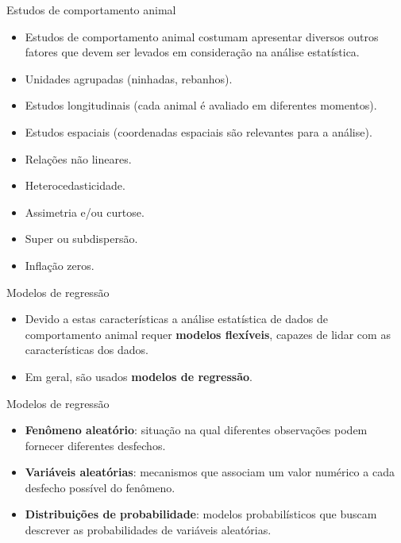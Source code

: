 \documentclass[
  ignorenonframetext,
  serif,
  professionalfont,
  usenames,
  dvipsnames,
  aspectratio = 169]{beamer}
\providecommand{\tightlist}{%
  \setlength{\itemsep}{0pt}\setlength{\parskip}{0pt}}
\renewcommand{\tightlist}{%
  \setlength{\itemsep}{0\baselineskip}
  \setlength{\parskip}{0.25\baselineskip}
}
\def\beginAHalfColumn{\begin{minipage}{0.49\textwidth}}%
\def\endColumns{\end{minipage}}%
\begin{document}
\begin{frame}{Estudos de comportamento animal}
\protect\hypertarget{estudos-de-comportamento-animal-2}{}
\begin{itemize}
\tightlist
\item
  Estudos de comportamento animal costumam apresentar diversos outros
  fatores que devem ser levados em consideração na análise estatística.
\end{itemize}

\beginAHalfColumn

\begin{itemize}
\item
  Unidades agrupadas (ninhadas, rebanhos).
\item
  Estudos longitudinais (cada animal é avaliado em diferentes momentos).
\item
  Estudos espaciais (coordenadas espaciais são relevantes para a
  análise).
\end{itemize}

\endColumns
\beginAHalfColumn

\begin{itemize}
\item
  Relações não lineares.
\item
  Heterocedasticidade.
\item
  Assimetria e/ou curtose.
\item
  Super ou subdispersão.
\item
  Inflação zeros.
\end{itemize}

\endColumns
\end{frame}

\begin{frame}{Modelos de regressão}
\protect\hypertarget{modelos-de-regressuxe3o}{}
\beginAHalfColumn

\begin{itemize}
\item
  Devido a estas características a análise estatística de dados de
  comportamento animal requer \textbf{modelos flexíveis}, capazes de
  lidar com as características dos dados.
\item
  Em geral, são usados \textbf{modelos de regressão}.
\end{itemize}

\endColumns
\beginAHalfColumn

\endColumns
\end{frame}

\begin{frame}{Modelos de regressão}
\protect\hypertarget{modelos-de-regressuxe3o-1}{}
\begin{itemize}
\item
  \textbf{Fenômeno aleatório}: situação na qual diferentes observações
  podem fornecer diferentes desfechos.
\item
  \textbf{Variáveis aleatórias}: mecanismos que associam um valor
  numérico a cada desfecho possível do fenômeno.
\item
  \textbf{Distribuições de probabilidade}: modelos probabilísticos que
  buscam descrever as probabilidades de variáveis aleatórias.
\end{itemize}
\end{frame}
\end{document}
